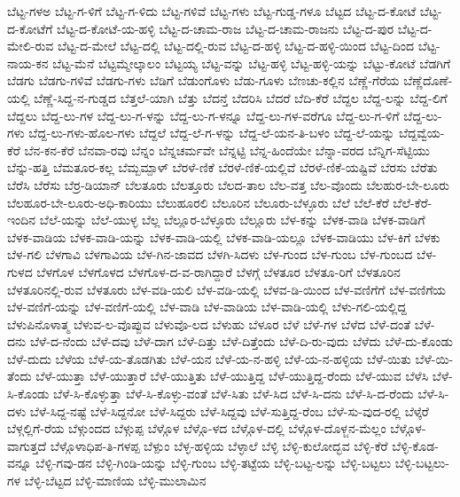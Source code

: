 ಬೆಟ್ಟ-ಗಳಅ
ಬೆಟ್ಟ-ಗ-ಳಿಗೆ
ಬೆಟ್ಟ-ಗ-ಳಿದು
ಬೆಟ್ಟ-ಗಳಿವೆ
ಬೆಟ್ಟ-ಗಳು
ಬೆಟ್ಟ-ಗುಡ್ಡ-ಗಳೂ
ಬೆಟ್ಟದ
ಬೆಟ್ಟ-ದ-ಕೋಟೆ
ಬೆಟ್ಟ-ದ-ಕೋಟೆಗೆ
ಬೆಟ್ಟ-ದ-ಕೋಟೆ-ಯ-ಹಳ್ಳಿ
ಬೆಟ್ಟ-ದ-ಚಾಮ-ರಾಜ
ಬೆಟ್ಟ-ದ-ಚಾಮ-ರಾಜನು
ಬೆಟ್ಟ-ದ-ಪುರ
ಬೆಟ್ಟ-ದ-ಮೇಲಿ-ರುವ
ಬೆಟ್ಟ-ದ-ಮೇಲೆ
ಬೆಟ್ಟ-ದಲ್ಲಿ
ಬೆಟ್ಟ-ದಲ್ಲಿ-ರುವ
ಬೆಟ್ಟ-ದ-ಹಳ್ಳಿ
ಬೆಟ್ಟ-ದ-ಹಳ್ಳಿ-ಯಿಂದ
ಬೆಟ್ಟ-ದಿಂದ
ಬೆಟ್ಟ-ನಾಯ-ಕನ
ಬೆಟ್ಟ-ಮೆನೆ
ಬೆಟ್ಟಮ್ಮೇಲ್ಕಾಲಂ
ಬೆಟ್ಟಯ್ಯ
ಬೆಟ್ಟ-ವನ್ನು
ಬೆಟ್ಟ-ಹಳ್ಳಿ
ಬೆಟ್ಟ-ಹಳ್ಳಿ-ಯನ್ನು
ಬೆಟ್ಟು-ಕೋಟೆ
ಬೆಡಗಿಗೆ
ಬೆಡಗು
ಬೆಡಗು-ಗಳಿವೆ
ಬೆಡಗು-ಗಳು
ಬೆಡಿಗೆ
ಬೆಡುಂಗೊಳು
ಬೆಡು-ಗೂಳು
ಬೆಣಚು-ಕಲ್ಲಿನ
ಬೆಣ್ಣೆ-ಗೆರೆಯ
ಬೆಣ್ಣೆದೊಣೆ-ಯಲ್ಲಿ
ಬೆಣ್ಣೆ-ಸಿದ್ದ-ನ-ಗುಡ್ಡದ
ಬೆತ್ತಲೆ-ಯಾಗಿ
ಬೆತ್ತು
ಬೆದನ್ತೆ
ಬೆದರಿಸಿ
ಬೆದರೆ
ಬೆದಿ-ಕೆರೆ
ಬೆದ್ದಲ
ಬೆದ್ದ-ಲನ್ನು
ಬೆದ್ದ-ಲಿಗೆ
ಬೆದ್ದಲು
ಬೆದ್ದ-ಲು-ಗಳ
ಬೆದ್ದ-ಲು-ಗ-ಳನ್ನು
ಬೆದ್ದ-ಲು-ಗ-ಳನ್ನೂ
ಬೆದ್ದ-ಲು-ಗಳ-ವರೆಗೂ
ಬೆದ್ದ-ಲು-ಗ-ಳಿಗೆ
ಬೆದ್ದ-ಲು-ಗಳು
ಬೆದ್ದ-ಲು-ಗಳು-ಹೊಲ-ಗಳು
ಬೆದ್ದಲೆ
ಬೆದ್ದ-ಲೆ-ಗ-ಳನ್ನು
ಬೆದ್ದ-ಲೆ-ಯನ-ತಿ-ಬಳಂ
ಬೆದ್ದ-ಲೆ-ಯನ್ನು
ಬೆದ್ದವ್ವೆಯ-ಕೆರೆ
ಬೆನ-ಕನ-ಕೆರೆ
ಬೆನವಾ-ರವು
ಬೆನ್ನಂ
ಬೆನ್ನಚರ್ಮವೇ
ಬೆನ್ನಟ್ಟಿ
ಬೆನ್ನ-ಹಿಂದೆಯೇ
ಬೆನ್ನಾ-ವರದ
ಬೆನ್ನಿಗ-ಸೆಟ್ಟಿಯು
ಬೆನ್ನು-ಹತ್ತಿ
ಬೆಮತೂರ-ಕಲ್ಲ
ಬೆಮ್ಬಮ್ಪಾಳ್
ಬೆರಳೆ-ಣಿಕೆ
ಬೆರಳೆ-ಣಿಕೆ-ಯಲ್ಲಿವೆ
ಬೆರಳೆ-ಣಿಕೆ-ಯಷ್ಟಿವೆ
ಬೆರಸು
ಬೆರೆತು
ಬೆರೆಸಿ
ಬೆರೆಸು
ಬೆರ್ರ-ಡಿಯಾನ್
ಬೆಲತೂರು
ಬೆಲತ್ತೂರು
ಬೆಲದ-ತಾಲ
ಬೆಲ-ವತ್ತ
ಬೆಲ-ವೊಂದು
ಬೆಲಹುರ-ಬೇ-ಲೂರು
ಬೆಲಹೂರ-ಬೇ-ಲೂರು-ಅಧಿ-ಕಾರಿಯು
ಬೆಲುಹೂರಲಿ
ಬೆಲೂರಿನ
ಬೆಲೂರು-ಬೆಳ್ಳೂರು
ಬೆಲೆ
ಬೆಲೆ-ಕೆರೆ
ಬೆಲೆ-ಕೆರೆ-ಇಂದಿನ
ಬೆಲೆ-ಯನ್ನು
ಬೆಲೆ-ಯುಳ್ಳ
ಬೆಲ್ಲ
ಬೆಲ್ಲೂರ-ಬೆಳ್ಳೂರು
ಬೆಲ್ಲೂರು
ಬೆಳ-ಕನ್ನು
ಬೆಳಕ-ವಾಡಿ
ಬೆಳಕ-ವಾಡಿಗೆ
ಬೆಳಕ-ವಾಡಿಯ
ಬೆಳಕ-ವಾಡಿ-ಯನ್ನು
ಬೆಳಕ-ವಾಡಿ-ಯಲ್ಲಿ
ಬೆಳಕ-ವಾಡಿ-ಯಲ್ಲೂ
ಬೆಳಕ-ವಾಡಿಯು
ಬೆಳ-ಕಿಗೆ
ಬೆಳಕು
ಬೆಳ-ಗಲಿ
ಬೆಳಗಾವಿ
ಬೆಳಗಾವಿಯ
ಬೆಳ-ಗಿನ-ಜಾವದ
ಬೆಳಗಿ-ಸಿದಳು
ಬೆಳ-ಗುಂದ
ಬೆಳ-ಗುಂಬ
ಬೆಳ-ಗುಂಬದ
ಬೆಳ-ಗುಳದ
ಬೆಳಗೊಳ
ಬೆಳಗೊಳದ
ಬೆಳಗೊಳ-ದ-ವ-ರಾಗಿದ್ದಾರೆ
ಬೆಳಗ್ಗೆ
ಬೆಳತೂರ
ಬೆಳತೂ-ರಿಗೆ
ಬೆಳತೂರಿನ
ಬೆಳತೂರಿನಲ್ಲಿ-ರುವ
ಬೆಳತೂರು
ಬೆಳ-ವಡಿ-ಯಲಿ
ಬೆಳ-ವಡಿ-ಯಲ್ಲಿ
ಬೆಳವ-ಡಿ-ಯಿಂದ
ಬೆಳ-ವಣಿಗೆಗೆ
ಬೆಳ-ವಣಿಗೆಯ
ಬೆಳ-ವಣಿಗೆ-ಯನ್ನು
ಬೆಳ-ವಣಿಗೆ-ಯಲ್ಲಿ
ಬೆಳ-ವಾಡಿ
ಬೆಳ-ವಾಡಿಯ
ಬೆಳ-ವಾಡಿ-ಯಲ್ಲಿ
ಬೆಳು-ಗಲಿ-ಯಲ್ಲಿದ್ದ
ಬೆಳುಪಿನೊಳಾತ್ಮ
ಬೆಳುವ-ಲ-ವೊಪ್ಪುವ
ಬೆಳುವೊ-ಲದ
ಬೆಳುಹು
ಬೆಳೂರ
ಬೆಳೆ
ಬೆಳೆ-ಗಳ
ಬೆಳೆದ
ಬೆಳೆ-ದಂತೆ
ಬೆಳೆ-ದನು
ಬೆಳೆ-ದ-ನೆಂದು
ಬೆಳೆ-ದವು
ಬೆಳೆ-ದಾಗ
ಬೆಳೆ-ದಿತ್ತು
ಬೆಳೆ-ದಿತ್ತೆಂದು
ಬೆಳೆ-ದಿ-ರು-ವುದು
ಬೆಳೆದು
ಬೆಳೆ-ದು-ಕೊಂಡು
ಬೆಳೆ-ದುದು
ಬೆಳೆಯ
ಬೆಳೆ-ಯ-ತೊಡಗಿತು
ಬೆಳೆ-ಯನ
ಬೆಳೆ-ಯ-ನ-ಹಳ್ಳಿ
ಬೆಳೆ-ಯ-ನ-ಹಳ್ಳಿಯ
ಬೆಳೆ-ಯಿತು
ಬೆಳೆ-ಯಿ-ತೆಂದು
ಬೆಳೆ-ಯುತ್ತಾ
ಬೆಳೆ-ಯುತ್ತಾರೆ
ಬೆಳೆ-ಯುತ್ತಿತು
ಬೆಳೆ-ಯುತ್ತಿದ್ದ
ಬೆಳೆ-ಯುತ್ತಿದ್ದ-ರೆಂದು
ಬೆಳೆ-ಯುವ
ಬೆಳೆಸಿ
ಬೆಳೆ-ಸಿ-ಕೊಂಡು
ಬೆಳೆ-ಸಿ-ಕೊಳ್ಳುತ್ತಾ
ಬೆಳೆ-ಸಿ-ಕೊಳ್ಳು-ವಂತೆ
ಬೆಳೆ-ಸಿತು
ಬೆಳೆ-ಸಿದ
ಬೆಳೆ-ಸಿ-ದನು
ಬೆಳೆ-ಸಿ-ದ-ರೆಂದು
ಬೆಳೆ-ಸಿ-ದಳು
ಬೆಳೆ-ಸಿದ್ದ-ನಷ್ಟೆ
ಬೆಳೆ-ಸಿದ್ದನೋ
ಬೆಳೆ-ಸಿದ್ದರು
ಬೆಳೆ-ಸಿದ್ದವು
ಬೆಳೆ-ಸುತ್ತಿದ್ದ-ರೆಂಬ
ಬೆಳೆ-ಸು-ವುದ-ರಲ್ಲಿ
ಬೆಳ್ಕೆರೆ
ಬೆಳ್ಗಲ್ಲಿಗೆ-ರೆಯ
ಬೆಳ್ಗುಂದದ
ಬೆಳ್ಗುಪ್ಪ
ಬೆಳ್ಗೊಳ
ಬೆಳ್ಗೊ-ಳದ
ಬೆಳ್ಗೊಳ-ದಲ್ಲಿ
ಬೆಳ್ಗೊಳ-ದೊಳ್ಜನ-ಮೆಲ್ಲಂ
ಬೆಳ್ಗೊಳ-ವಾಗುತ್ತದೆ
ಬೆಳ್ಗೊಳಾಧಿಪ-ತಿ-ಗಳಪ್ಪ
ಬೆಳ್ಪುಂ
ಬೆಳ್ಳ-ಹಳ್ಳಿಯ
ಬೆಳ್ಳಾಲೆ
ಬೆಳ್ಳಿ
ಬೆಳ್ಳಿ-ಕುಲೋದ್ಭವ
ಬೆಳ್ಳಿ-ಕೆರೆ
ಬೆಳ್ಳಿ-ಕೊಡ-ವನ್ನೂ
ಬೆಳ್ಳಿ-ಗವು-ಡನ
ಬೆಳ್ಳಿ-ಗಿಂಡಿ-ಯನ್ನು
ಬೆಳ್ಳಿ-ಗುಂಬ
ಬೆಳ್ಳಿ-ತಟ್ಟೆಯ
ಬೆಳ್ಳಿ-ಬಟ್ಟ-ಲನ್ನು
ಬೆಳ್ಳಿ-ಬಟ್ಟಲು
ಬೆಳ್ಳಿ-ಬಟ್ಟಲು-ಗಳ
ಬೆಳ್ಳಿ-ಬೆಟ್ಟದ
ಬೆಳ್ಳಿ-ಮಾಣಿಯ
ಬೆಳ್ಳಿ-ಮುಲಾಮಿನ
